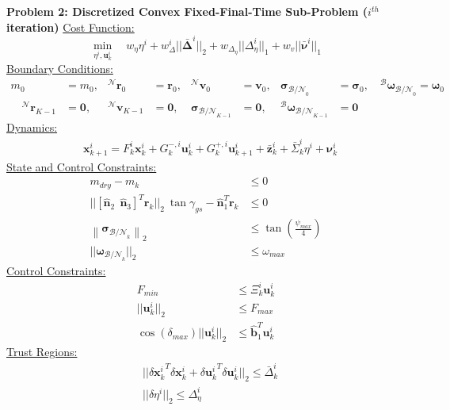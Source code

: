 \documentclass[conf]{new-aiaa}
\begin{document}
\clearpage
\begin{mdframed}
\label{problem2}
\textbf{Problem 2: Discretized Convex Fixed-Final-Time Sub-Problem ($i^{th}$ iteration)}
\underline{Cost Function:}
\begin{equation*}
\min_{\eta^i, \mathbf{u}_k^i} \quad w_\eta \eta^i + w_\Delta^i || \bm{\bar{\Delta}}^i ||_2 + w_{\Delta_\eta} || \Delta_\eta^i ||_1 + w_v || \bar{\bm{\nu}}^i ||_1
\end{equation*}
%
\underline{Boundary Conditions:}  
\begin{align*}
m_0 &= m_0, &^\mathcal{N}\mathbf{r}_0 &= \mathbf{r}_0, & ^\mathcal{N}\mathbf{v}_0 &= \mathbf{v}_0, & \boldsymbol{\sigma}_{\mathcal{B/N}_0} &= {\boldsymbol{\sigma}_0}, \quad ^\mathcal{B}\boldsymbol{\omega}_{\mathcal{B/N}_0} = \boldsymbol{\omega}_0 \\
\quad ^\mathcal{N}\mathbf{r}_{K-1} &= \mathbf{0}, & ^\mathcal{N}\mathbf{v}_{K-1} &= \mathbf{0}, & \boldsymbol{\sigma}_{\mathcal{B/N}_{K-1}} &= \mathbf{0}, & ^\mathcal{B}\boldsymbol{\omega}_{\mathcal{B/N}_{K-1}} &= \mathbf{0}
\end{align*}
%
\underline{Dynamics:}  
\begin{align*}
& \mathbf{x}_{k+1}^i = F_k^i\mathbf{x}_k^i + G^{-,i}_k\mathbf{u}_k^i + G_k^{+,i}\mathbf{u}_{k+1}^i + \bar{\mathbf{z}}^i_k +\bar{\Sigma}_k^i\eta^i + \bm{\nu}_k^i
\end{align*}
%
\underline{State and Control Constraints:}
\begin{align*}
m_{dry} - m_k & \leq 0 \\
|| [\hat{\bm{n}}_2 \ \ \hat{\bm{n}}_3 ]^T \mathbf{r}_k \lvert\lvert_2 \ \tan{\gamma_{gs}}  - \hat{\bm{n}}_1^T \mathbf{r}_k & \leq 0 \\
%
\left \lVert \boldsymbol{\sigma}_{\mathcal{B/N}_k} \right \lVert_2 &\leq \tan \left( \frac{\psi_{max}}{4} \right) \\
%
|| \bm{\omega}_{\mathcal{B/N}_k} ||_2 & \leq \omega_{max}
\end{align*}
%
\underline{Control Constraints:}  
\begin{align*}
F_{min} &\leq \Xi_k^i\mathbf{u}_k^i \\
|| \mathbf{u}_k^i ||_2 &\leq F_{max} \\
\cos(\delta_{max}) || \mathbf{u}_k^i ||_2 &\leq \hat{\bm{b}}_1^T \mathbf{u}_k^i
\end{align*}
%
\underline{Trust Regions:}  
\begin{align*}
& ||{\delta \mathbf{x}_k^i}^T  \delta \mathbf{x}_k^i + {\delta \mathbf{u}_k^i}^T \delta \mathbf{u}_k^i ||_2 \leq \bar{\Delta}_k^i \\
& || \delta \eta^i ||_2 \leq \Delta_\eta^i
\end{align*}
\end{mdframed}
\end{document}
